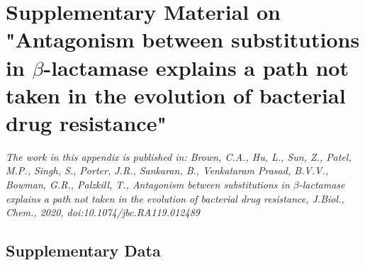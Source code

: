\documentclass[../main.tex]{subfiles}
\begin{document}
	
	\graphicspath{{AppendixD/}}
	\chapter{Supplementary Material on "Antagonism between substitutions in $\beta$-lactamase explains a path not taken in the evolution of bacterial drug resistance"}
	\label{ch:caz-supp-info}
	
    \textit{The work in this appendix is published in: Brown, C.A., Hu, L., Sun, Z., Patel, M.P., Singh, S., Porter, J.R., Sankaran, B., Venkataram Prasad, B.V.V., Bowman, G.R., Palzkill, T., Antagonism between substitutions in $\beta$-lactamase explains a path not taken in the evolution of bacterial drug resistance, J.Biol., Chem., 2020, doi:10.1074/jbc.RA119.012489} \cite{brown_antagonism_2020} \\

\section{Supplementary Data}
    
\end{document}
